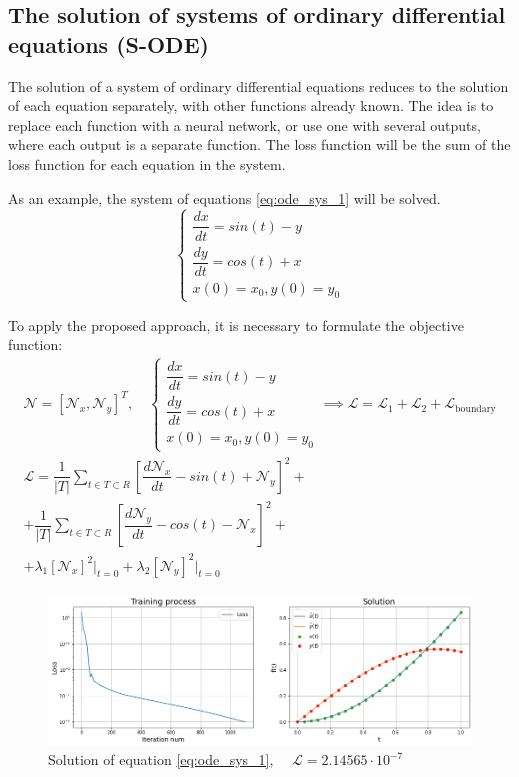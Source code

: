 \subsection{The solution of systems of ordinary differential equations (S-ODE)}
The solution of a system of ordinary differential equations reduces to the solution of each equation separately, with other functions already known. The idea is to replace each function with a neural network, or use one with several outputs, where each output is a separate function. The loss function will be the sum of the loss function for each equation in the system.

As an example, the system of equations \eqref{eq:ode_sys_1}  will be solved.
\begin{equation}
	 \label{eq:ode_sys_1}
	\begin{cases}
		\dfrac{d x}{d t} = sin(t) - y \\[10pt]
		\dfrac{d y}{d t} = cos(t) + x \\[10pt]
		x(0) = x_0, y(0) = y_0
	\end{cases}
\end{equation}

To apply the proposed approach, it is necessary to formulate the objective function:
\begin{equation}
	\label{eq:loss_ode_sys_1}
	\begin{multlined}
		\mathcal{N} = [ \mathcal{N}_x, \mathcal{N}_y ]^T, \quad
		\begin{cases}
			\dfrac{d x}{d t} = sin(t) - y \\[10pt]
			\dfrac{d y}{d t} = cos(t) + x \\[10pt]
			x(0) = x_0, y(0) = y_0
		\end{cases} \implies \mathcal{L} = \mathcal{L}_1 + \mathcal{L}_2 + \mathcal{L}_{\text{boundary}} \\ \mathcal{L} = \dfrac{1}{\left | T \right |} \sum_{t \in T \subset R} \left [ \dfrac{d \mathcal{N}_x}{d t} - sin(t) + \mathcal{N}_y \right ]^2 + \\ + \dfrac{1}{\left | T \right |} \sum_{t \in T \subset R} \left [ \dfrac{d \mathcal{N}_y}{d t} - cos(t) - \mathcal{N}_x \right ]^2 + \\ + \lambda_1 \left [ \mathcal{N}_x \right ]^2 \big|_{t = 0} + \lambda_2 \left [ \mathcal{N}_y \right ]^2 \big|_{t = 0}
	\end{multlined}
\end{equation}

\begin{figure}
	\centering
	\includegraphics[width=1 \textwidth]{images/chapter2/ode_sys_1_res.png}
	\caption{Solution of equation \eqref{eq:ode_sys_1}, $\quad \mathcal{L} = 2.14565 \cdot 10^{-7} $ }
	\label{fig:ode_sys_1_res}
\end{figure}

